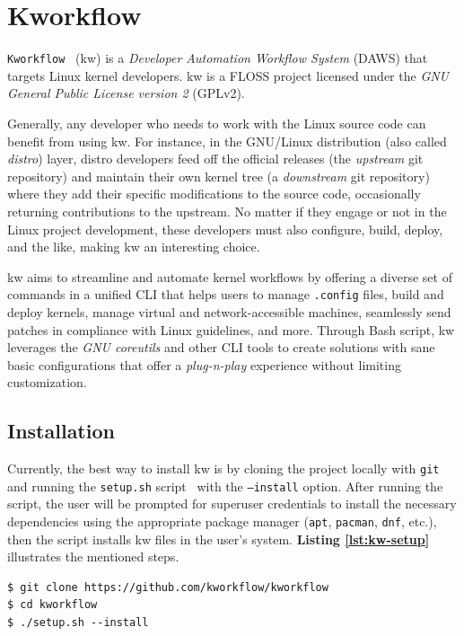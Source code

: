 \section{Kworkflow}

\texttt{Kworkflow}~\cite{kworkflow} (kw) is a \textit{Developer Automation
Workflow System} (DAWS) that targets Linux kernel developers. kw is a FLOSS
project licensed under the \textit{GNU General Public License version 2}
(GPLv2).

Generally, any developer who needs to work with the Linux source code can
benefit from using kw. For instance, in the GNU/Linux distribution (also called
\textit{distro}) layer, distro developers feed off the official releases (the
\textit{upstream} git repository) and maintain their own kernel tree (a
\textit{downstream} git repository) where they add their specific modifications
to the source code, occasionally returning contributions to the upstream. No
matter if they engage or not in the Linux project development, these developers
must also configure, build, deploy, and the like, making kw an interesting
choice.

kw aims to streamline and automate kernel workflows by offering a diverse set of
commands in a unified CLI that helps users to manage \texttt{.config} files,
build and deploy kernels, manage virtual and network-accessible machines,
seamlessly send patches in compliance with Linux guidelines, and more. Through
Bash script, kw leverages the \textit{GNU coreutils} and other CLI tools to
create solutions with sane basic configurations that offer a
\textit{plug-n-play} experience without limiting customization.

\subsection{Installation}

Currently, the best way to install kw is by cloning the project locally with
\texttt{git} and running the \texttt{setup.sh} script~\cite{kworkflow-setup}
with the \texttt{--install} option. After running the script, the user will be
prompted for superuser credentials to install the necessary dependencies using
the appropriate package manager (\texttt{apt}, \texttt{pacman}, \texttt{dnf},
etc.), then the script installs kw files in the user's system. \textbf{Listing
\ref{lst:kw-setup}} illustrates the mentioned steps.

\begin{lstlisting}[caption={Installing kw via the \texttt{setup.sh} script.}, label={lst:kw-setup}]
$ git clone https://github.com/kworkflow/kworkflow
$ cd kworkflow
$ ./setup.sh --install
\end{lstlisting}

